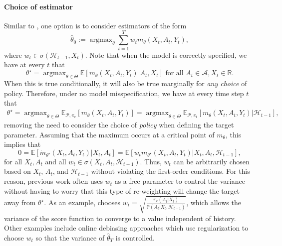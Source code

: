 \documentclass[11pt]{article}
\newcommand{\E}{\mathbb{E}}
\DeclareMathOperator*{\argmax}{argmax}
\begin{document}
\paragraph{Choice of estimator} Similar to \cite{zhang2021mestimators}, one option is to consider estimators of the form
\begin{equation*}
\hat{\theta}_{0} :=  \argmax_{\theta} \sum_{t=1}^{T}  w_{t} m_{\theta}(X_{t},A_{t},Y_{t}),
\end{equation*}
where $w_{t} \in \sigma(\mathcal{H}_{t-1},X_{t})$. Note that when the model is correctly specified, we have at every $t$ that
\begin{equation}\label{eqn:theta_star_mis}
  \theta^{\star} = \argmax_{\theta \in \Theta} \E \left[ m_{\theta} (X_{t},A_{t},Y_{t}) |A_{t}, X_{t} \right] \text{ for all } A_{t} \in \mathcal{A}, X_{t} \in \mathbb{R}.  
\end{equation} 
When this is true conditionally, it will also be true marginally for \emph{any choice} of policy. Therefore, under no model misspecification, we have at every time step $t$ that 
\begin{align*}
    \theta^{\star} 
= \argmax_{\theta \in \Theta}\mathbb{E}_{\mathcal{P}, \pi_{e}}\left[ m_{\theta}(X_{t},A_{t},Y_{t}) \right]  
= \argmax_{\theta \in \Theta}\mathbb{E}_{\mathcal{P}, \pi_{t}}\left[ m_{\theta}(X_{t},A_{t},Y_{t}) |\mathcal{H}_{t-1} \right],
\end{align*}
removing the need to consider the choice of \emph{policy} when defining the target parameter. Assuming that the maximum occurs at a critical point of $m_{\theta}$, this implies that
$$0 = \E\left[\dot{m}_{\theta^{\star}}(X_{t},A_{t},Y_{t}) |X_{t},A_{t}\right] = \E\left[w_{t} \dot{m}_{\theta^{\star}}(X_{t},A_{t},Y_{t}) |X_{t},A_{t},\mathcal{H}_{t-1}\right],$$
for all $X_{t},A_{t}$ and all $w_{t} \in \sigma(X_{t},A_{t},\mathcal{H}_{t-1})$.
Thus, $w_{t}$ can be arbitrarily chosen based on $X_t$, $A_t$, and $\mathcal{H}_{t-1}$ without violating the first-order conditions. For this reason, previous work often uses $w_t$ as a free parameter to control the variance without having to worry that this type of re-weighting will change the target away from $\theta^{\star}$. As an example, \cite{zhang2021mestimators} chooses $w_{t} = \sqrt{\frac{\pi_{e}(A_{t} | X_{t})}{ \mathbb{P} (A_{t}  | X_{t}, \mathcal{H}_{t-1}) }}$, which allows the variance of the score function to converge to a value independent of history.  Other examples include online debiasing approaches \citep{pmlr-v80-deshpande18a,khamaru2021near} which use regularization to choose $w_{t}$ so that the variance of $\hat{\theta}_{T}$ is controlled.
\end{document}
